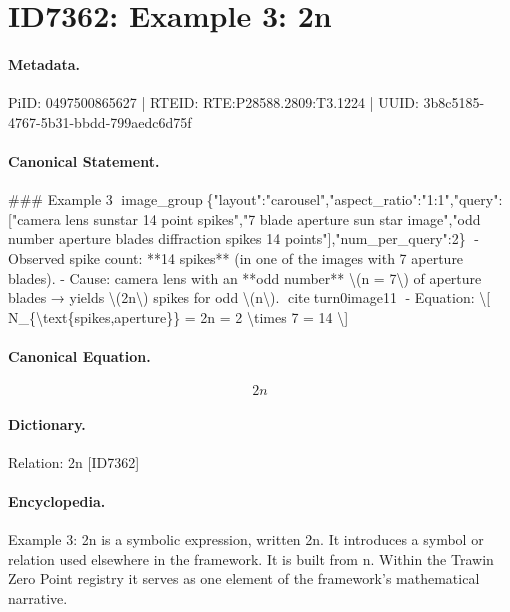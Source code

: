 \section*{ID7362: Example 3: 2n}
\paragraph{Metadata.}
PiID: 0497500865627 | RTEID: RTE:P28588.2809:T3.1224 | UUID: 3b8c5185-4767-5b31-bbdd-799aedc6d75f

\paragraph{Canonical Statement.}
\#\#\# Example 3 image\_group\{"layout":"carousel","aspect\_ratio":"1:1","query":["camera lens sunstar 14 point spikes","7 blade aperture sun star image","odd number aperture blades diffraction spikes 14 points"],"num\_per\_query":2\} - Observed spike count: **14 spikes** (in one of the images with 7 aperture blades). - Cause: camera lens with an **odd number** \textbackslash{}(n = 7\textbackslash{}) of aperture blades → yields \textbackslash{}(2n\textbackslash{}) spikes for odd \textbackslash{}(n\textbackslash{}). citeturn0image11 - Equation: \textbackslash{}[ N\_\{\textbackslash{}text\{spikes,aperture\}\} = 2n = 2 \textbackslash{}times 7 = 14 \textbackslash{}]

\paragraph{Canonical Equation.}
\[
2n
\]

\paragraph{Dictionary.}
Relation: 2n [ID7362]

\paragraph{Encyclopedia.}
Example 3: 2n is a symbolic expression, written 2n. It introduces a symbol or relation used elsewhere in the framework. It is built from n. Within the Trawin Zero Point registry it serves as one element of the framework's mathematical narrative.
